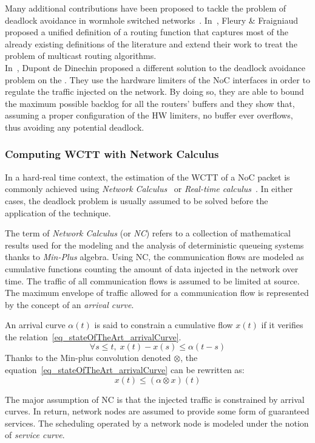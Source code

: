 \documentclass[main.tex]{subfiles}
\begin{document}
Many additional contributions have been proposed to tackle the problem of deadlock avoidance in wormhole switched networks~\cite{Jayasimha2003, Lin1991, Schwiebert1995}. In~\cite{Fleury98}, Fleury \& Fraigniaud proposed a unified definition of a routing function that captures most of the already existing definitions of the literature and extend their work to treat the problem of multicast routing algorithms. \\

In~\cite{Dinechin2014NoCArc}, Dupont de Dinechin \etal proposed a different solution to the deadlock avoidance problem on the \mppalong. They use the hardware limiters of the NoC interfaces in order to regulate the traffic injected on the network. By doing so, they are able to bound the maximum possible backlog for all the routers' buffers and they show that, assuming a proper configuration of the HW limiters, no buffer ever overflows, thus avoiding any potential deadlock.\\



\subsubsection{Computing WCTT with Network Calculus}

In a hard-real time context, the estimation of the WCTT of a NoC packet is commonly achieved using \emph{Network Calculus}~\cite{LeBoudec2001, Cruz91} or \emph{Real-time calculus}~\cite{Thiele2000}. In either cases, the deadlock problem is usually assumed to be solved before the application of the technique.


The term of \emph{Network Calculus} (or \emph{NC}) refers to a collection of mathematical results used for the modeling and the analysis of deterministic queueing systems thanks to \emph{Min-Plus} algebra. Using NC, the communication flows are modeled as cumulative functions counting the amount of data injected in the network over time. The traffic of all communication flows is assumed to be limited at source. The maximum envelope of traffic allowed for a communication flow is represented by the concept of an \emph{arrival curve}.

\begin{definition}
An arrival curve $\alpha(t)$ is said to constrain a cumulative flow $x(t)$ if it verifies the relation~\ref{eq_stateOfTheArt_arrivalCurve}.
\begin{equation}
    \label{eq_stateOfTheArt_arrivalCurve}
    \forall s \leq t, \;  x(t) - x(s) \leq \alpha(t-s)
\end{equation}
Thanks to the Min-plus convolution denoted $\otimes$, the equation~\ref{eq_stateOfTheArt_arrivalCurve} can be rewritten as:
    \begin{displaymath}
        x(t) \leq ( \alpha \otimes x ) (t)
    \end{displaymath}
\end{definition}
The major assumption of NC is that the  injected traffic is constrained by arrival curves. In return, network nodes are assumed to provide some form of guaranteed services. The scheduling operated by a network node is modeled under the notion of \emph{service curve}. 
\end{document}
